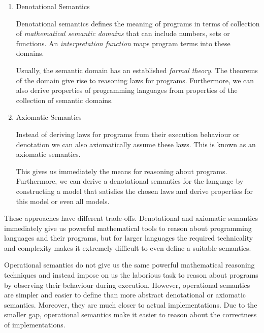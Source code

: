 {\begin{enumerate}


\item Denotational Semantics

  Denotational semantics defines the meaning of programs in terms of collection
  of \emph{mathematical semantic domains} that can include numbers, sets or
  functions. An \emph{interpretation function} maps program terms into these
  domains.

  Usually, the semantic domain has an established \emph{formal theory}. The
  theorems of the domain give rise to reasoning laws for programs. Furthermore,
  we can also derive properties of programming languages from properties of the
  collection of semantic domains.

\item Axiomatic Semantics

  Instead of deriving laws for programs from their execution behaviour or
  denotation we can also axiomatically assume these laws. This is known as an
  axiomatic semantics.

  This gives us immediately the means for reasoning about programs. Furthermore,
  we can derive a denotational semantics for the language by constructing a
  model that satisfies the chosen laws and derive properties for this model or
  even all models.

\end{enumerate}

These approaches have different trade-offs. Denotational and axiomatic semantics
immediately give us powerful mathematical tools to reason about programming
languages and their programs, but for larger languages the required technicality
and complexity makes it extremely difficult to even define a suitable semantics.

Operational semantics do not give us the same powerful mathematical reasoning
techniques and instead impose on us the laborious task to reason about programs
by observing their behaviour during execution. However, operational semantics
are simpler and easier to define than more abstract denotational or axiomatic
semantics. Moreover, they are much closer to actual implementations. Due to the
smaller gap, operational semantics make it easier to reason about the
correctness of implementations.

}
